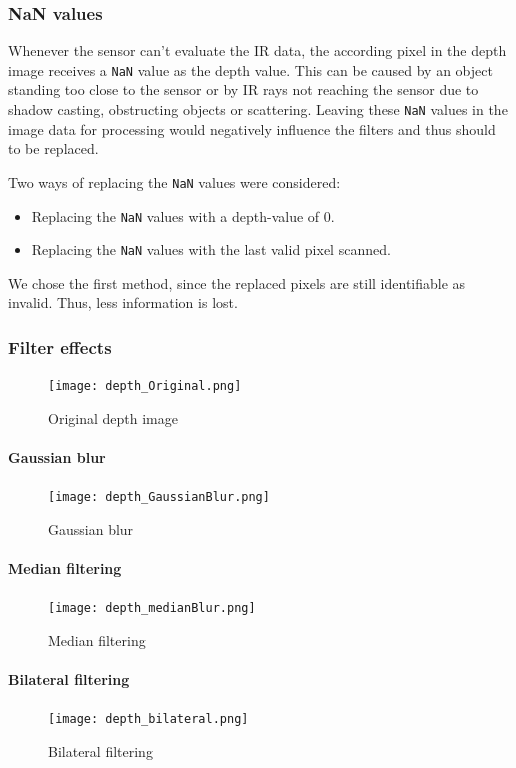 \documentclass[DIV12,a4paper]{scrartcl}
\begin{document}
\subsubsection{NaN values}
\label{sec:nan}
Whenever the sensor can't evaluate the IR data, the according pixel in the depth image receives a \texttt{NaN} value as the depth value. This can be caused by an object standing too close to the sensor or by IR rays not reaching the sensor due to shadow casting, obstructing objects or scattering. Leaving these \texttt{NaN} values in the image data for processing would negatively influence the filters and thus should to be replaced.\par
Two ways of replacing the \texttt{NaN} values were considered: 
\begin{itemize}
\item Replacing the \texttt{NaN} values with a depth-value of 0.
\item Replacing the \texttt{NaN} values with the last valid pixel scanned.
\end{itemize}
We chose the first method, since the replaced pixels are still identifiable as invalid. Thus, less information is lost.

\subsubsection{Filter effects}
\label{sec:filter_effects}
\begin{figure}[!htbp]
  \centering
  \texttt{[image: depth\_Original.png]}
  \caption{Original depth image}
  \label{fig:original_depth}
\end{figure}

\paragraph{Gaussian blur}
\begin{figure}[!htbp]
  \centering
  \texttt{[image: depth\_GaussianBlur.png]}
  \caption{Gaussian blur}
  \label{fig:gaussian_blur}
\end{figure}
\paragraph{Median filtering}
\begin{figure}[!htbp]
  \centering
  \texttt{[image: depth\_medianBlur.png]}
  \caption{Median filtering}
  \label{fig:median_depth}
\end{figure}
\paragraph{Bilateral filtering}
\begin{figure}[!htbp]
  \centering
  \texttt{[image: depth\_bilateral.png]}
  \caption{Bilateral filtering}
  \label{fig:bilateral_depth}
\end{figure}
\end{document}
